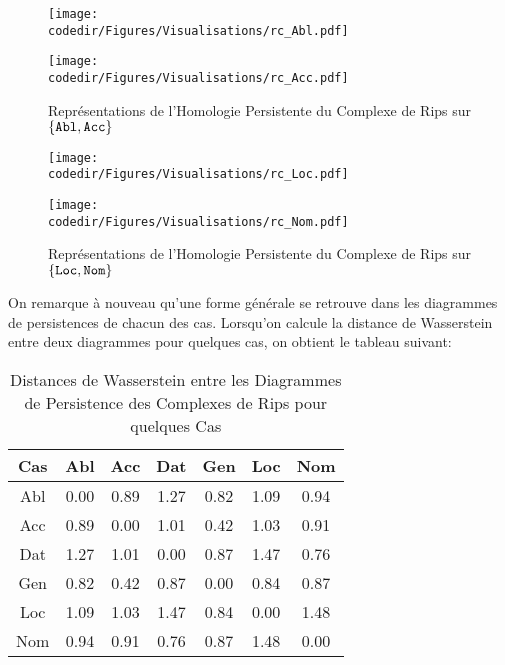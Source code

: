 \begin{figure}[H]
    \begin{minipage}{.5\textwidth}
        \begin{center}
            \texttt{[image: \\codedir/Figures/Visualisations/rc\_Abl.pdf]}
        \end{center}
    \end{minipage}
    \begin{minipage}{.5\textwidth}
        \begin{center}
            \texttt{[image: \\codedir/Figures/Visualisations/rc\_Acc.pdf]}
        \end{center}
    \end{minipage}
    \caption{Représentations de l'Homologie Persistente du Complexe de Rips sur $\{\tt Abl,Acc\}$}
\end{figure}

\begin{figure}[H]
    \begin{minipage}{.5\textwidth}
        \begin{center}
            \texttt{[image: \\codedir/Figures/Visualisations/rc\_Loc.pdf]}
        \end{center}
    \end{minipage}
    \begin{minipage}{.5\textwidth}
        \begin{center}
            \texttt{[image: \\codedir/Figures/Visualisations/rc\_Nom.pdf]}
        \end{center}
    \end{minipage}
    \caption{Représentations de l'Homologie Persistente du Complexe de Rips sur $\{\tt Loc,Nom\}$}
\end{figure}

On remarque à nouveau qu'une forme générale se retrouve dans les diagrammes de persistences de chacun des cas.
Lorsqu'on calcule la distance de Wasserstein entre deux diagrammes pour quelques cas, on obtient le tableau suivant:
\begin{table}[H]
	\centering
	\begin{tabular}{c|cccccc}
		\toprule
		Cas & Abl & Acc & Dat & Gen & Loc & Nom\\
		\midrule
		Abl & 0.00 & 0.89 & 1.27 & 0.82 & 1.09 & 0.94\\
		Acc & 0.89 & 0.00 & 1.01 & 0.42 & 1.03 & 0.91\\
		Dat & 1.27 & 1.01 & 0.00 & 0.87 & 1.47 & 0.76\\
		Gen & 0.82 & 0.42 & 0.87 & 0.00 & 0.84 & 0.87\\
		Loc & 1.09 & 1.03 & 1.47 & 0.84 & 0.00 & 1.48\\
		Nom & 0.94 & 0.91 & 0.76 & 0.87 & 1.48 & 0.00\\
		\bottomrule
	\end{tabular}
	\caption{Distances de Wasserstein entre les Diagrammes de Persistence des Complexes de Rips pour quelques Cas}
\end{table}



